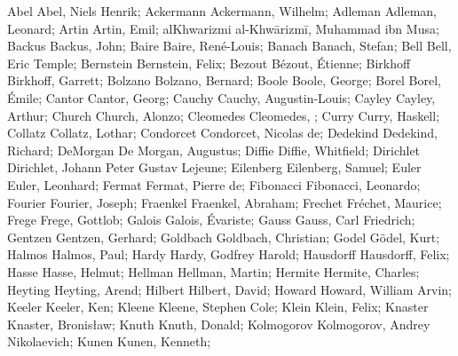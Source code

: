 \DefFriend Abel             Abel, Niels Henrik;
\DefFriend Ackermann        Ackermann, Wilhelm;
\DefFriend Adleman          Adleman, Leonard;
\DefFriend Artin            Artin, Emil;
\DefFriend alKhwarizmi      al-Khwārizmī, Muhammad ibn Musa;
\DefFriend Backus           Backus, John;
\DefFriend Baire            Baire, René-Louis;
\DefFriend Banach           Banach, Stefan;
\DefFriend Bell             Bell, Eric Temple;
\DefFriend Bernstein        Bernstein, Felix;
\DefFriend Bezout           Bézout, Étienne;
\DefFriend Birkhoff         Birkhoff, Garrett;
\DefFriend Bolzano          Bolzano, Bernard;
\DefFriend Boole            Boole, George;
\DefFriend Borel            Borel, Émile;
\DefFriend Cantor           Cantor, Georg;
\DefFriend Cauchy           Cauchy, Augustin-Louis;
\DefFriend Cayley           Cayley, Arthur;
\DefFriend Church           Church, Alonzo;
\DefFriend Cleomedes        Cleomedes, ; %
\DefFriend Curry            Curry, Haskell;
\DefFriend Collatz          Collatz, Lothar;
\DefFriend Condorcet        Condorcet, Nicolas de;
\DefFriend Dedekind         Dedekind, Richard;
\DefFriend DeMorgan         De Morgan, Augustus;
\DefFriend Diffie           Diffie, Whitfield;
\DefFriend Dirichlet        Dirichlet, Johann Peter Gustav Lejeune;
\DefFriend Eilenberg        Eilenberg, Samuel;
\DefFriend Euler            Euler, Leonhard;
\DefFriend Fermat           Fermat, Pierre de;
\DefFriend Fibonacci        Fibonacci, Leonardo;
\DefFriend Fourier          Fourier, Joseph;
\DefFriend Fraenkel         Fraenkel, Abraham;
\DefFriend Frechet          Fréchet, Maurice;
\DefFriend Frege            Frege, Gottlob;
\DefFriend Galois           Galois, Évariste;
\DefFriend Gauss            Gauss, Carl Friedrich;
\DefFriend Gentzen          Gentzen, Gerhard;
\DefFriend Goldbach         Goldbach, Christian;
\DefFriend Godel            Gödel, Kurt;
\DefFriend Halmos           Halmos, Paul;
\DefFriend Hardy            Hardy, Godfrey Harold;
\DefFriend Hausdorff        Hausdorff, Felix;
\DefFriend Hasse            Hasse, Helmut;
\DefFriend Hellman          Hellman, Martin;
\DefFriend Hermite          Hermite, Charles;
\DefFriend Heyting          Heyting, Arend;
\DefFriend Hilbert          Hilbert, David;
\DefFriend Howard           Howard, William Arvin;
\DefFriend Keeler           Keeler, Ken;
\DefFriend Kleene           Kleene, Stephen Cole;
\DefFriend Klein            Klein, Felix;
\DefFriend Knaster          Knaster, Bronisław;
\DefFriend Knuth            Knuth, Donald;
\DefFriend Kolmogorov       Kolmogorov, Andrey Nikolaevich;
\DefFriend Kunen            Kunen, Kenneth;
